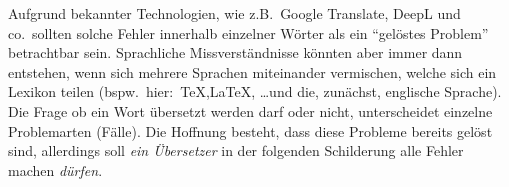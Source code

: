Aufgrund bekannter Technologien, wie z.B.\ Google Translate, DeepL und co.\ sollten solche Fehler innerhalb einzelner Wörter als ein \enquote{gelöstes Problem} betrachtbar sein. Sprachliche Missverständnisse könnten aber immer dann entstehen, wenn sich mehrere Sprachen miteinander vermischen, welche sich ein Lexikon teilen (bspw.\ hier:\ \TeX{},\LaTeX{}, \ldots und die, zunächst, englische Sprache). Die Frage ob ein Wort übersetzt werden darf oder nicht, unterscheidet einzelne Problemarten (Fälle). Die Hoffnung besteht, dass diese Probleme bereits gelöst sind, allerdings soll \textit{ein Übersetzer} in der folgenden Schilderung alle Fehler machen \textit{dürfen}.







\newpage


